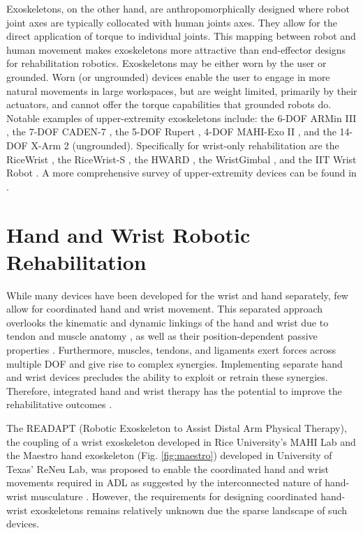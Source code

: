    Exoskeletons, on the other hand, are anthropomorphically designed where robot joint axes are typically collocated with human joints axes. They allow for the direct application of torque to individual joints. This mapping between robot and human movement makes exoskeletons more attractive than end-effector designs for rehabilitation robotics. Exoskeletons may be either worn by the user or grounded. Worn (or ungrounded) devices enable the user to engage in more natural movements in large workspaces, but are weight limited, primarily by their actuators, and cannot offer the torque capabilities that grounded robots do. Notable examples of upper-extremity exoskeletons include: the 6-DOF ARMin III \cite{nef2007}, the 7-DOF CADEN-7 \cite{perry2007}, the 5-DOF Rupert \cite{sugar2007}, 4-DOF MAHI-Exo II \cite{pehlivan2011}, and the 14-DOF X-Arm 2 (ungrounded). Specifically for wrist-only rehabilitation are the RiceWrist \cite{omalley2006,gupta2008}, the RiceWrist-S \cite{pehlivan2012,pehlivan2013,pehlivan2014}, the HWARD \cite{takahashi2008}, the WristGimbal \cite{martinez2013}, and the IIT Wrist Robot \cite{cappello2014}. A more comprehensive survey of upper-extremity devices can be found in \cite{maciejasz2014}.

    \section{Hand and Wrist Robotic Rehabilitation} \label{sec:rehab}

    While many devices have been developed for the wrist and hand \cite{schabowsky2010,bouzit2002,cempini2014,chiri2009,kawasaki2007} separately, few allow for coordinated hand and wrist movement. This separated approach overlooks the kinematic and dynamic linkings of the hand and wrist due to tendon and muscle anatomy \cite{li2002}, as well as their position-dependent passive properties \cite{deshpande2012, kuo2010, knutson2000,esteki1996}. Furthermore, muscles, tendons, and ligaments exert forces across multiple DOF and give rise to complex synergies. Implementing separate hand and wrist devices precludes the ability to exploit or retrain these synergies. Therefore, integrated hand and wrist therapy has the potential to improve the rehabilitative outcomes \cite{rose2015}.

    The READAPT (Robotic Exoskeleton to Assist Distal Arm Physical Therapy), the coupling of a wrist exoskeleton developed in Rice University's MAHI Lab and the Maestro hand exoskeleton (Fig. \ref{fig:maestro}) developed in University of Texas' ReNeu Lab, was proposed to enable the coordinated hand and wrist movements required in ADL as suggested by the interconnected nature of hand-wrist musculature \cite{rose2015}. However, the requirements for designing coordinated hand-wrist exoskeletons remains relatively unknown due the sparse landscape of such devices.

